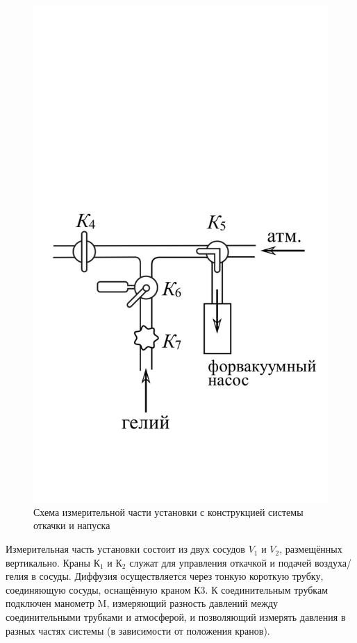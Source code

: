 \documentclass[a4paper,12pt]{article}
\theoremstyle{plain} %
\theoremstyle{definition} %
\theoremstyle{remark} %
\begin{document}
\begin{figure}[h]
\begin{center}
\begin{minipage}[h]{0.25\linewidth}
		\end{minipage}
		\begin{minipage}[h]{0.3\linewidth}
			\includegraphics[width=1\linewidth]{3}
		\end{minipage}
	\end{center}
\caption{Схема измерительной части установки с конструкцией системы откачки и напуска }
\end{figure}
Измерительная часть установки состоит из двух сосудов $V_1$ и $V_2$, размещённых вертикально. Краны $\text{К}_1$ и $\text{К}_2$ служат для управления откачкой и подачей воздуха/гелия в сосуды. Диффузия осуществляется через тонкую короткую трубку, соединяющую сосуды, оснащённую краном $\text{К3}$. К соединительным трубкам подключен манометр M, измеряющий разность давлений между соединительными трубками и атмосферой, и позволяющий измерять давления в разных частях системы (в зависимости от положения кранов).
\end{document}
